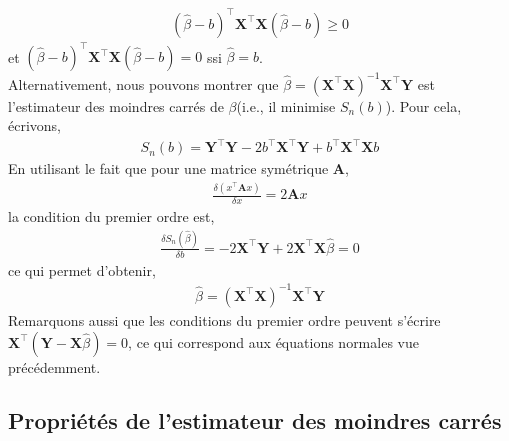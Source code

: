 \begin{align*}
(\widehat{\beta}-b)^\top \mathbf{X}^\top\mathbf{X} (\widehat{\beta}-b) \geq 0
\end{align*}
et $(\widehat{\beta}-b)^\top \mathbf{X}^\top\mathbf{X} (\widehat{\beta}-b) = 0$ ssi $\widehat{\beta} = b$.\\
Alternativement, nous pouvons montrer que $\widehat{\beta}=(\mathbf{X}^\top\mathbf{X})^{-1}\mathbf{X}^\top\mathbf{Y}$ est l'estimateur des moindres carrés de $\beta$(i.e., il minimise $S_n(b)$). Pour cela, écrivons,
\begin{align*}
S_n(b) = \mathbf{Y}^\top\mathbf{Y} - 2b^\top\mathbf{X}^\top\mathbf{Y}+b^\top\mathbf{X}^\top\mathbf{X}b
\end{align*}
En utilisant le fait que pour une matrice symétrique $\mathbf{A}$,
\begin{align*}
\frac{\delta (x^\top\mathbf{A}x)}{\delta x} = 2\mathbf{A}x
\end{align*}
la condition du premier ordre est,
\begin{align*}
\frac{\delta S_n(\widehat{\beta})}{\delta b} = -2\mathbf{X}^\top\mathbf{Y} + 2\mathbf{X}^\top\mathbf{X}\widehat{\beta} = 0
\end{align*}
ce qui permet d'obtenir,
\begin{align*}
\widehat{\beta} = (\mathbf{X}^\top\mathbf{X})^{-1}\mathbf{X}^\top\mathbf{Y}
\end{align*}
Remarquons aussi que les conditions du premier ordre peuvent s'écrire $\mathbf{X}^\top(\mathbf{Y} - \mathbf{X}\widehat{\beta}) = 0$, ce qui correspond aux équations normales vue précédemment.

\subsection{Propriétés de l'estimateur des moindres carrés}


